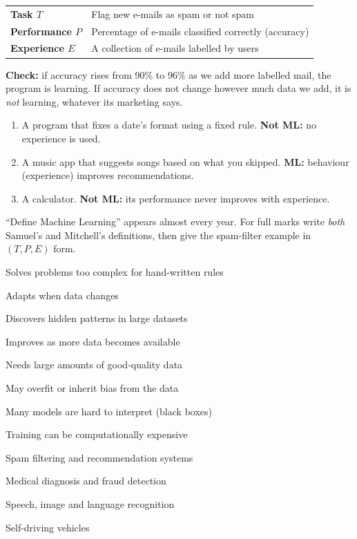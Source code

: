 \begin{example}
\begin{center}
\begin{tabular}{@{}ll@{}}
\toprule
\textbf{Task $T$} & Flag new e-mails as spam or not spam\\
\textbf{Performance $P$} & Percentage of e-mails classified correctly (accuracy)\\
\textbf{Experience $E$} & A collection of e-mails labelled by users\\
\bottomrule
\end{tabular}
\end{center}
\textbf{Check:} if accuracy rises from 90\% to 96\% as we add more labelled mail, the program is learning. If accuracy does not change however much data we add, it is \emph{not} learning, whatever its marketing says.
\end{example}

\begin{example}
\begin{enumerate}[label=(\alph*)]
  \item A program that fixes a date's format using a fixed rule. \textbf{Not ML:} no experience is used.
  \item A music app that suggests songs based on what you skipped. \textbf{ML:} behaviour (experience) improves recommendations.
  \item A calculator. \textbf{Not ML:} its performance never improves with experience.
\end{enumerate}
\end{example}

\begin{exam}
``Define Machine Learning'' appears almost every year. For full marks write \emph{both} Samuel's and Mitchell's definitions, then give the spam-filter example in $(T,P,E)$ form.
\end{exam}


{\item Solves problems too complex for hand-written rules
 \item Adapts when data changes
 \item Discovers hidden patterns in large datasets
 \item Improves as more data becomes available}
{\item Needs large amounts of good-quality data
 \item May overfit or inherit bias from the data
 \item Many models are hard to interpret (black boxes)
 \item Training can be computationally expensive}
{\item Spam filtering and recommendation systems
 \item Medical diagnosis and fraud detection
 \item Speech, image and language recognition
 \item Self-driving vehicles}

